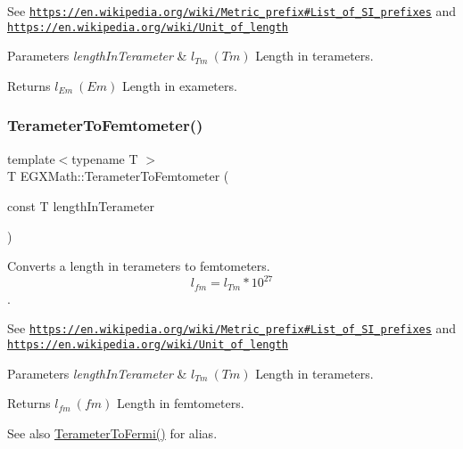 See \href{https://en.wikipedia.org/wiki/Metric_prefix#List_of_SI_prefixes}{\tt https\+://en.\+wikipedia.\+org/wiki/\+Metric\+\_\+prefix\#\+List\+\_\+of\+\_\+\+S\+I\+\_\+prefixes} and \href{https://en.wikipedia.org/wiki/Unit_of_length}{\tt https\+://en.\+wikipedia.\+org/wiki/\+Unit\+\_\+of\+\_\+length} 
\begin{DoxyParams}{Parameters}
{\em length\+In\+Terameter} & $ l_{Tm}\ (Tm)$ Length in terameters. \\
\hline
\end{DoxyParams}
\begin{DoxyReturn}{Returns}
$ l_{Em}\ (Em)$ Length in exameters. 
\end{DoxyReturn}
\mbox{\label{group___e_g_x_math-_conversions-_length_conversions-_terameter-_s_i_ga3baa4e53ebd4305bc80d9b998720eba5}} 
\subsubsection{\texorpdfstring{Terameter\+To\+Femtometer()}{TerameterToFemtometer()}}
{\footnotesize\ttfamily template$<$typename T $>$ \\
T E\+G\+X\+Math\+::\+Terameter\+To\+Femtometer (\begin{DoxyParamCaption}\item[{const T}]{length\+In\+Terameter }\end{DoxyParamCaption})}



Converts a length in terameters to femtometers. \[ l_{fm}=l_{Tm} * 10^{27} \]. 

See \href{https://en.wikipedia.org/wiki/Metric_prefix#List_of_SI_prefixes}{\tt https\+://en.\+wikipedia.\+org/wiki/\+Metric\+\_\+prefix\#\+List\+\_\+of\+\_\+\+S\+I\+\_\+prefixes} and \href{https://en.wikipedia.org/wiki/Unit_of_length}{\tt https\+://en.\+wikipedia.\+org/wiki/\+Unit\+\_\+of\+\_\+length} 
\begin{DoxyParams}{Parameters}
{\em length\+In\+Terameter} & $ l_{Tm}\ (Tm)$ Length in terameters. \\
\hline
\end{DoxyParams}
\begin{DoxyReturn}{Returns}
$ l_{fm}\ (fm)$ Length in femtometers. 
\end{DoxyReturn}
\begin{DoxySeeAlso}{See also}
\mbox{\hyperlink{group___e_g_x_math-_conversions-_length_conversions-_terameter-_non-_s_i_ga5bf639553e4b6e8520f9345def06e492}{Terameter\+To\+Fermi()}} for alias. 
\end{DoxySeeAlso}
\mbox{\label{group___e_g_x_math-_conversions-_length_conversions-_terameter-_s_i_gaf7d05e4ba6ba85ee7c75c65647178cb8}} 
